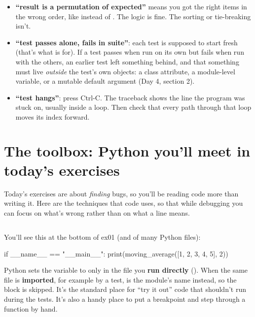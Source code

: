 \documentclass[10pt,a4paper]{article}
\begin{document}
\begin{itemize}
\item \textbf{“result is a permutation of expected”} means you got the right items in the wrong order, like  instead of . The logic is fine. The sorting or tie-breaking isn’t.
\item \textbf{“test passes alone, fails in suite”}: each test is supposed to start fresh (that’s what  is for). If a test passes when run on its own but fails when run with the others, an earlier test left something behind, and that something must live \emph{outside} the test’s own objects: a class attribute, a module-level variable, or a mutable default argument (Day 4, section 2).
\item \textbf{“test hangs”}: press Ctrl-C. The traceback shows the line the program was stuck on, usually inside a  loop. Then check that every path through that loop moves its index forward.
\end{itemize}
\setcounter{section}{6}
\section{The toolbox: Python you’ll meet in today’s exercises}
Today’s exercises are about \emph{finding} bugs, so you’ll be reading code more than writing it. Here are the techniques that code uses, so that while debugging you can focus on what’s wrong rather than on what a line means.
\subsection{}
You’ll see this at the bottom of ex01 (and of many Python files):
\begin{pycode}
if __name__ == "__main__":
    print(moving_average([1, 2, 3, 4, 5], 2))
\end{pycode}
Python sets the variable  to  only in the file you \textbf{run directly} (). When the same file is \textbf{imported}, for example by a test,  is the module’s name instead, so the block is skipped. It’s the standard place for “try it out” code that shouldn’t run during the tests. It’s also a handy place to put a breakpoint and step through a function by hand.
\end{document}
